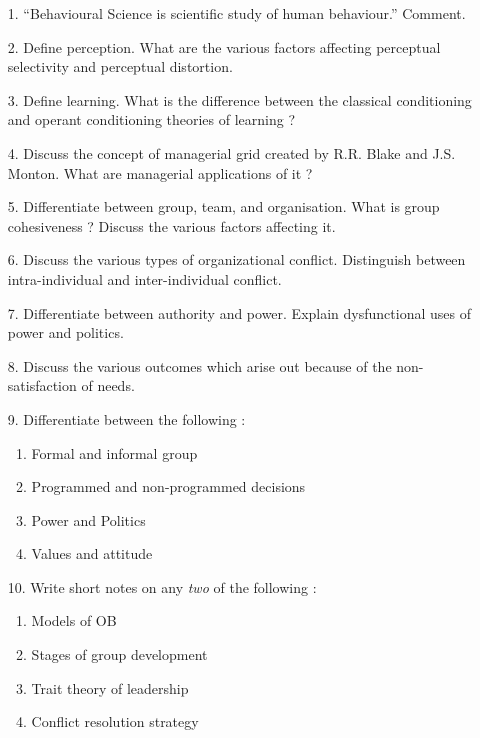 \documentclass[12pt]{article}
\begin{document}
\begin{enumerate}

	\item[1.] ``Behavioural Science is scientific study of human behaviour.'' Comment.

	\item[2.] Define perception. What are the various factors affecting perceptual selectivity and perceptual distortion.

	\item[3.] Define learning. What is the difference between the classical conditioning and operant conditioning theories of learning ?

	\item[4.] Discuss the concept of managerial grid created by R.R. Blake and J.S. Monton. What are managerial applications of it ?

	\item[5.] Differentiate between group, team, and organisation. What is group cohesiveness ? Discuss the various factors affecting it.

	\item[6.] Discuss the various types of organizational conflict. Distinguish between intra-individual and inter-individual conflict.

	\item[7.] Differentiate between authority and power. Explain dysfunctional uses of power and politics.

	\item[8.] Discuss the various outcomes which arise out because of the non-satisfaction of needs.

	\item[9.] Differentiate between the following :
	\begin{enumerate}
		\item Formal and informal group
		\item Programmed and non-programmed decisions
		\item Power and Politics
		\item Values and attitude
		\end{enumerate} 

	\item[10.] Write short notes on any \textit{two} of the following :
	\begin{enumerate}
		\item Models of OB
		\item Stages of group development
		\item Trait theory of leadership
		\item Conflict resolution strategy
	\end{enumerate}

\end{enumerate}
\end{document}
